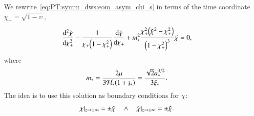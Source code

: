 






 



We rewrite~\cref{eq:PT:symm_dws:eom_asym_chi_s} in terms of the time coordinate $\chi_+ =\sqrt{1-\upsilon}$,
\begin{equation}%
    \dv[2]{\brchi}{\chi_+} - \frac{1}{\chi_+ \pclosed{1-\chi_+^2}} \dv{\brchi}{\chi_+} + m_\ast^2 \frac{\chi_+^2 \pclosed{\brchi^2-\chi_+^2}}{\pclosed{1-\chi_+^2}^3}\brchi = 0,
\end{equation}
where
\begin{equation}%
    m_\ast= \frac{2\mu}{3\mathcal{H}_\ast \pclosed{1+\redshift_\ast}} = \frac{\sqrt{2}a_\ast^{3/2}}{3\xi_\ast}.
\end{equation}
The idea is to use this solution as boundary conditions for $\chi$:
\begin{equation}
    \chi|_{z\to \pm\infty} =\pm \breve{\chi} \quad \land \quad \dot{\chi}|_{z\to \pm\infty} =\pm \dot{\breve{\chi}}.
\end{equation}
